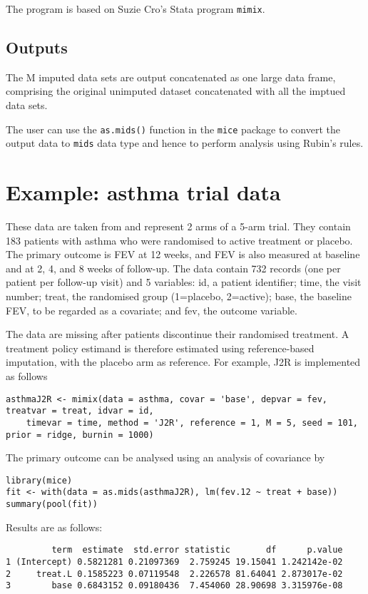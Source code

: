 The program is based on Suzie Cro’s Stata program \texttt{mimix}.

\subsection{Outputs}

The M imputed data sets are output concatenated as one large data frame, comprising the 
original unimputed dataset concatenated with all the imptued data sets.

The user can use the \texttt{as.mids()} function in the \texttt{mice} package to convert the output data  to \texttt{mids} data type and hence to perform analysis using Rubin's rules.



\section{Example: asthma trial data}

These data are taken from \citet{Cro++16} and represent 2 arms of a 5-arm trial. 
They contain 183 patients with asthma who were randomised to active treatment or placebo. 
The primary outcome is FEV at 12 weeks, and FEV is also measured at baseline and at 2, 4, and 8 weeks of follow-up.
The data contain 732 records (one per patient per follow-up visit) and 5 variables: 
id, a patient identifier; 
time, the visit number; 
treat, the randomised group (1=placebo, 2=active); 
base, the baseline FEV, to be regarded as a covariate;
and fev, the outcome variable.

The data are missing after patients discontinue their randomised treatment. 
A treatment policy estimand is therefore estimated using reference-based imputation, with the placebo arm as reference. 
For example, J2R is implemented as follows
\begin{verbatim}
asthmaJ2R <- mimix(data = asthma, covar = 'base', depvar = fev, treatvar = treat, idvar = id, 
    timevar = time, method = 'J2R', reference = 1, M = 5, seed = 101, prior = ridge, burnin = 1000)
\end{verbatim}

The primary outcome can be analysed using an analysis of covariance by
\begin{verbatim}
library(mice)     
fit <- with(data = as.mids(asthmaJ2R), lm(fev.12 ~ treat + base))
summary(pool(fit))    
\end{verbatim}
Results are as follows:
\begin{verbatim}
         term  estimate  std.error statistic       df      p.value
1 (Intercept) 0.5821281 0.21097369  2.759245 19.15041 1.242142e-02
2     treat.L 0.1585223 0.07119548  2.226578 81.64041 2.873017e-02
3        base 0.6843152 0.09180436  7.454060 28.90698 3.315976e-08
\end{verbatim}


